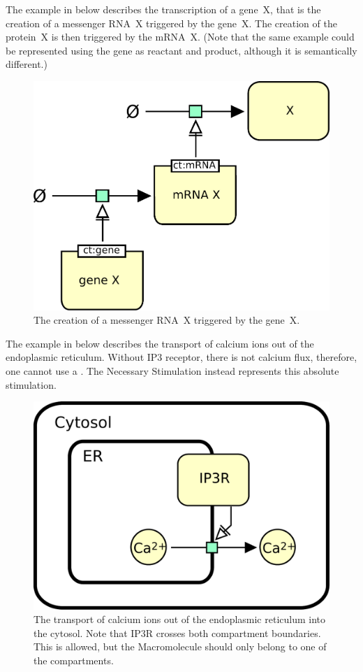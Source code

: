 The example in  below describes the transcription of a gene~X, that is the creation of a messenger RNA~X triggered by the gene~X.  The creation of the protein~X is then triggered by the mRNA~X.  (Note that the same example could be represented using the gene as reactant and product, although it is semantically different.)

\begin{figure}[H]
  \centering
  \includegraphics[scale = 0.5]{le_images/necessary_stim-genetic}
  \caption{The creation of a messenger RNA~X triggered by the gene~X.}
  \label{fig:necessary_stim-gene}
\end{figure}


The example in  below describes the transport of calcium ions out of the endoplasmic reticulum. Without IP3 receptor, there is not calcium flux, therefore, one cannot use a . The Necessary Stimulation instead represents this absolute stimulation.

\begin{figure}[H]
  \centering
  \includegraphics[scale = 0.5]{le_images/necessary_stim-transport}
  \caption{The transport of calcium ions out of the endoplasmic reticulum into the cytosol. Note that IP3R crosses both compartment boundaries. This is allowed, but the Macromolecule should only belong to one of the compartments.}
  \label{fig:necessary_stim-calcium}
\end{figure}


